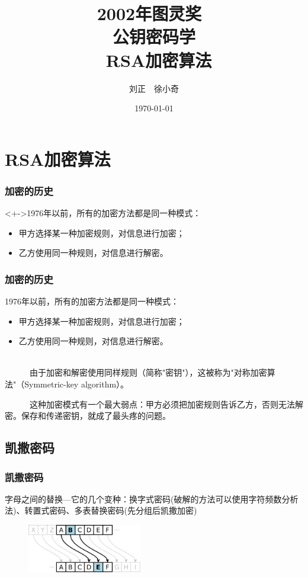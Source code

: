 \documentclass[slidestop,compress,mathserif]{beamer}
\title{2002年图灵奖~\\~公钥密码学~\\~RSA加密算法}
\author{刘正~~徐小奇}
\date{\today}
\begin{document}
\frame{\titlepage}

\section{RSA加密算法}

\begin{frame}
  \frametitle{加密的历史}
  
  \begin{block}<+->{1976年以前，所有的加密方法都是同一种模式：}
    \begin{itemize}[<+->]
        \item 甲方选择某一种加密规则，对信息进行加密；
        \item 乙方使用同一种规则，对信息进行解密。
    \end{itemize}
  \end{block}

\end{frame}

\begin{frame}
  \frametitle{加密的历史}
  
  \begin{block}{1976年以前，所有的加密方法都是同一种模式：}
    \begin{itemize}
        \item 甲方选择某一种加密规则，对信息进行加密；
        \item 乙方使用同一种规则，对信息进行解密。
    \end{itemize}
  \end{block}
  ~\\[0.6cm]

~ ~ ~ ~由于加密和解密使用同样规则（简称"密钥"），这被称为"对称加密算法"（Symmetric-key algorithm）。

~ ~ ~ ~这种加密模式有一个最大弱点：甲方必须把加密规则告诉乙方，否则无法解密。保存和传递密钥，就成了最头疼的问题。
\end{frame}

\subsection{\hfill 凯撒密码}
\begin{frame}
  \frametitle{凯撒密码}
  字母之间的替换---它的几个变种：换字式密码(破解的方法可以使用字符频数分析法)、转置式密码、多表替换密码(先分组后凯撒加密)
  \begin{figure}
    \centering
    \includegraphics[width=5cm]{Caesar3.png}
  \end{figure}
\end{frame}
\end{document}
